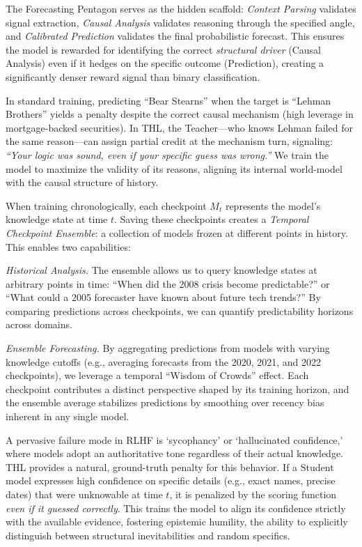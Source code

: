 \documentclass[11pt,a4paper]{article}
\begin{document}
The Forecasting Pentagon serves as the hidden scaffold: \textit{Context Parsing} validates signal extraction, \textit{Causal Analysis} validates reasoning through the specified angle, and \textit{Calibrated Prediction} validates the final probabilistic forecast. This ensures the model is rewarded for identifying the correct \textit{structural driver} (Causal Analysis) even if it hedges on the specific outcome (Prediction), creating a significantly denser reward signal than binary classification.

In standard training, predicting ``Bear Stearns'' when the target is ``Lehman Brothers'' yields a penalty despite the correct causal mechanism (high leverage in mortgage-backed securities). In THL, the Teacher---who knows Lehman failed for the same reason---can assign partial credit at the mechanism turn, signaling: \textit{``Your logic was sound, even if your specific guess was wrong.''} We train the model to maximize the validity of its reasons, aligning its internal world-model with the causal structure of history.

When training chronologically, each checkpoint $M_t$ represents the model's knowledge state at time $t$. Saving these checkpoints creates a \textit{Temporal Checkpoint Ensemble}: a collection of models frozen at different points in history. This enables two capabilities:

\medskip\noindent\textit{Historical Analysis.}
The ensemble allows us to query knowledge states at arbitrary points in time: ``When did the 2008 crisis become predictable?'' or ``What could a 2005 forecaster have known about future tech trends?'' By comparing predictions across checkpoints, we can quantify predictability horizons across domains.

\medskip\noindent\textit{Ensemble Forecasting.}
By aggregating predictions from models with varying knowledge cutoffs (e.g., averaging forecasts from the 2020, 2021, and 2022 checkpoints), we leverage a temporal ``Wisdom of Crowds'' effect. Each checkpoint contributes a distinct perspective shaped by its training horizon, and the ensemble average stabilizes predictions by smoothing over recency bias inherent in any single model.

A pervasive failure mode in RLHF is `sycophancy' or `hallucinated confidence,' where models adopt an authoritative tone regardless of their actual knowledge. THL provides a natural, ground-truth penalty for this behavior. If a Student model expresses high confidence on specific details (e.g., exact names, precise dates) that were unknowable at time $t$, it is penalized by the scoring function \textit{even if it guessed correctly}. This trains the model to align its confidence strictly with the available evidence, fostering epistemic humility, the ability to explicitly distinguish between structural inevitabilities and random specifics.
\end{document}
